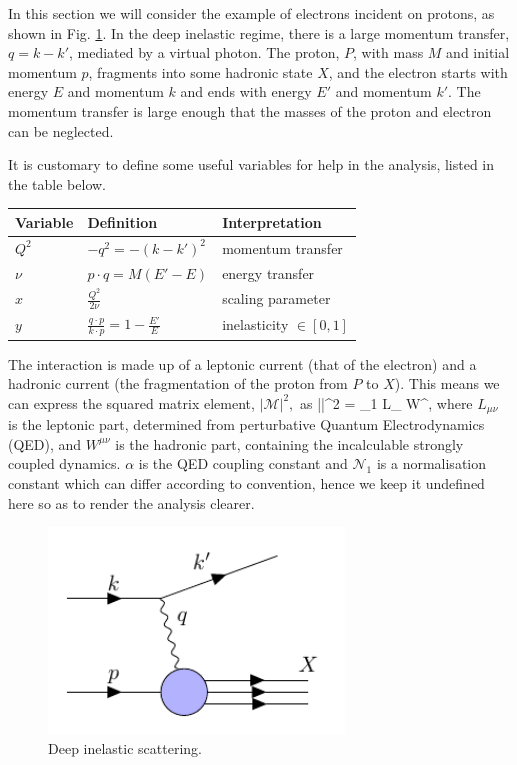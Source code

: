 In this section we will consider the example of electrons incident on protons, as shown in Fig. \ref{fig:dis}. In the deep inelastic regime, there is a large momentum transfer, $q=k-k'$, mediated by a virtual photon. The proton, $P$, with mass $M$ and initial momentum $p$, fragments into some hadronic state $X$, and the electron starts with energy $E$ and momentum $k$ and ends with energy $E'$ and momentum $k'$. The momentum transfer is large enough that the masses of the proton and electron can be neglected. 

It is customary to define some useful variables for help in the analysis, listed in the table below.
\begin{table}[H]
\centering
\begin{tabular}{l|l|l}
  Variable & Definition & Interpretation   \\
 \hline
  $Q^2$ & $- q^2 = -(k-k')^2$   & momentum transfer    \\
  $\nu$ & $p \cdot q = M(E'-E)$ & energy transfer  \\
  $x$   & $\frac{Q^2}{2\nu}$    & scaling parameter \\
  $y$   & $\frac{q \cdot p}{k \cdot p} = 1 - \frac{E'}{E}$ & inelasticity $\in [0,1]$
\end{tabular}
\end{table}
The interaction is made up of a leptonic current (that of the electron) and a hadronic current (the fragmentation of the proton from $P$ to $X$). This means we can express the squared matrix element, $|\mathcal{M}|^2,$ as
\be
\label{eqn:matrixelement}
||^2 = _1  L_{\mu\nu} W^{\mu\nu},
\ee
where $L_{\mu\nu}$ is the leptonic part, determined from perturbative Quantum Electrodynamics (QED), and $W^{\mu\nu}$ is the hadronic part, containing the incalculable strongly coupled dynamics. $\alpha$ is the QED coupling constant and $\mathcal{N}_1$ is a normalisation constant which can differ according to convention, hence we keep it undefined here so as to render the analysis clearer.
\begin{figure}[H]
\centering
\includegraphics[width=0.7\textwidth]{../diagrams/disdiag.pdf}
\caption{Deep inelastic scattering. \label{fig:dis}}
\end{figure}

